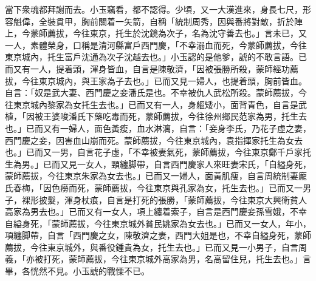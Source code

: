 當下衆魂都拜謝而去。小玉竊看，都不認得。{}少頃，又一大漢進來，身長七尺，形容魁偉，全裝貫甲，胸前關着一矢箭，自稱「統制周秀，因與番將對敵，折於陣上，今蒙師薦拔，今往東京，托生於沈鏡為次子，名為沈守善去也。」言未已，又一人，素體榮身，口稱是清河縣富戶西門慶，「不幸溺血而死，今蒙師薦拔，今往東京城內，托生富戶沈通為次子沈越去也。」小玉認的是他爹，諕的不敢言語。已而又有一人，提着頭，渾身皆血，自言是陳敬濟，「因被張勝所殺，蒙師經功薦拔，今往東京城內，與王家為子去也。」已而又見一婦人，也提着頭，胸前皆血。自言：「奴是武大妻、西門慶之妾潘氏是也。不幸被仇人武松所殺。蒙師薦拔，今往東京城內黎家為女托生去也。」已而又有一人，身軀矮小，面背青色，自言是武植，「因被王婆唆潘氏下藥吃毒而死，蒙師薦拔，今往徐州鄉民范家為男，托生去也。」{}已而又有一婦人，面色黃瘦，血水淋漓，自言：「妾身李氏，乃花子虛之妻，西門慶之妾，因害血山崩而死。蒙師薦拔，今往東京城內，袁指揮家托生為女去也。」已而又一男，自言花子虛，「不幸被妻氣死，蒙師薦拔，今往東京鄭千戶家托生為男。」已而又見一女人，頸纏脚帶，自言西門慶家人來旺妻宋氏，「自縊身死，蒙師薦拔，今往東京朱家為女去也。」已而又一婦人，面黃肌瘦，自言周統制妻龐氏春梅，「因色癆而死，蒙師薦拔，今往東京與孔家為女，托生去也。」已而又一男子，裸形披髮，渾身杖痕，自言是打死的張勝，「蒙師薦拔，今往東京大興衛貧人高家為男去也。」已而又有一女人，項上纏着索子，自言是西門慶妾孫雪娥，不幸自縊身死，「蒙師薦拔，今往東京城外貧民姚家為女去也。」已而又一女人，年小，項纏脚帶，自言「西門慶之女，陳敬濟之妻，西門大姐是也，不幸自縊身死，蒙師薦拔，今往東京城外，與番役鍾貴為女，托生去也。」已而又見一小男子，自言周義，「亦被打死，蒙師薦拔，今往東京城外高家為男，名高留住兒，托生去也。」言畢，各恍然不見。小玉諕的戰慄不已。

